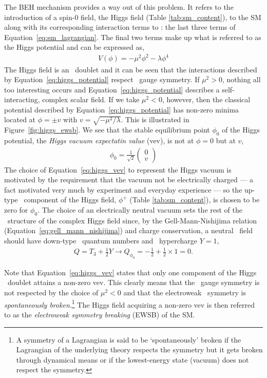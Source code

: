 The BEH mechanism provides a way out of this problem. It refers to the introduction of a
spin-0 field, the Higgs field (Table \ref{tab:sm_content}), to the SM along with its corresponding interaction
terms to \SML: the last three terms of Equation~\ref{eq:sm_lagrangian}. The final two terms make up
what is referred to as the Higgs potential and can be expressed as,
\begin{align}
	V(\phi) = - \mu^2 \phi^2 - \lambda \phi^4
	\label{eq:higgs_potential}
\end{align}
The Higgs field is an \SUtwo~doublet and it can be seen that the interactions
described by Equation~\ref{eq:higgs_potential} respect \SUtwo~gauge symmetry.
If $\mu^2>0$, nothing all too interesting occurs and Equation~\ref{eq:higgs_potential} describes
a self-interacting, complex scalar field. If we take $\mu^2<0$, however, then the classical
potential described by Equation~\ref{eq:higgs_potential} has non-zero minima located at
$\phi = \pm v$ with $v = \sqrt{-\mu^2 / \lambda}$.
This is illustrated in Figure~\ref{fig:higgs_ewsb}. We see that the stable equilibrium point $\phi_0$
of the Higgs potential, the \textit{Higgs vacuum expectatin value} (vev), is not at $\phi = 0$
but at $v$,
\begin{align}
	\phi_0 = \frac{1}{\sqrt{2}} \left( \begin{matrix} 0 \\ v \end{matrix} \right)
	\label{eq:higgs_vev}
\end{align}
The choice of Equation~\ref{eq:higgs_vev} to represent the Higgs vacuum is motivated by
the requirement that the vacuum not be electrically charged --- a fact motivated very much
by experiment and everyday experience --- so the up-type \SUtwo~component of the Higgs field, $\phi^+$ (Table \ref{tab:sm_content}), is chosen to be zero for $\phi_0$. The choice of an
electrically neutral vacuum sets the rest of the \SUewk~structure of the complex Higgs field
since, by the Gell-Mann-Nishijima relation (Equation~\ref{eq:gell_mann_nishijima}) and charge
conservation,
a  neutral \SUewk~field should have down-type \SUtwo~quantum numbers and \Uone~hypercharge
$Y=1$,
\begin{align}
	Q = T_3 + \frac{1}{2}Y \rightarrow Q_{\phi_0} = -\frac{1}{2} + \frac{1}{2} \times 1 = 0.
	\label{eq:higgs_charge}
\end{align}

Note that Equation~\ref{eq:higgs_vev} states that only one component of the Higgs \SUtwo~doublet
attains a non-zero vev. This clearly means that the \SUtwo~gauge symmetry is not respected
by the choice of $\mu^2 < 0$ and that the electroweak \SUewk~symmetry is
\textit{spontaneously broken}.\footnote{A symmetry of a Lagrangian is said to be
	`spontaneously' broken if the Lagrangian of the underlying theory
	respects the symmetry but it gets broken through dynamical means or if the lowest-energy
	state (vacuum) does not respect the symmetry.
} The Higgs field
acquiring a non-zero vev is then referred to as the \textit{electroweak symmetry breaking} (EWSB) of the SM.

